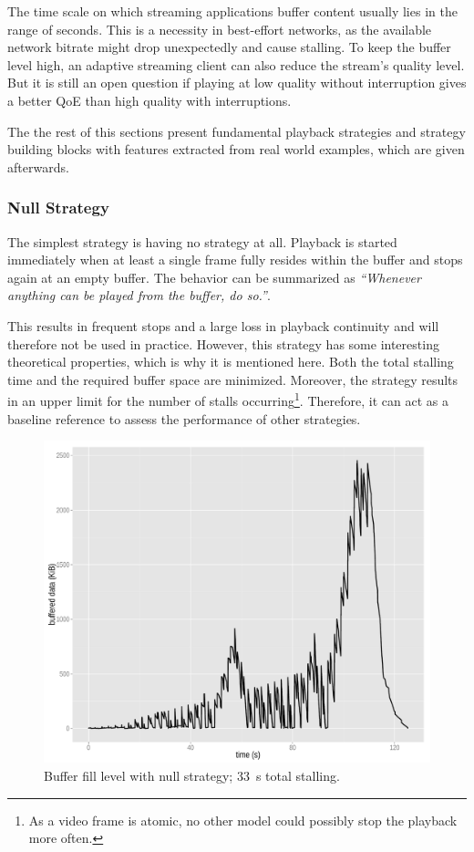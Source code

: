 The time scale on which streaming applications buffer content usually lies in the range of seconds. This is a necessity in best-effort networks, as the available network bitrate might drop unexpectedly and cause stalling. To keep the buffer level high, an adaptive streaming client can also reduce the stream's quality level. But it is still an open question if playing at low quality without interruption gives a better \gls{QoE} than high quality with interruptions.

The the rest of this sections present fundamental playback strategies and strategy building blocks with features extracted from real world examples, which are given afterwards. 



\subsubsection{Null Strategy}

The simplest strategy is having no strategy at all. Playback is started immediately when at least a single frame fully resides within the buffer and stops again at an empty buffer. The behavior can be summarized as \textit{``Whenever anything can be played from the buffer, do so.''}.

This results in frequent stops and a large loss in playback continuity and will therefore not be used in practice. However, this strategy has some interesting theoretical properties, which is why it is mentioned here. Both the total stalling time and the required buffer space are minimized. Moreover, the strategy results in an upper limit for the number of stalls occurring\footnote{As a video frame is atomic, no other model could possibly stop the playback more often.}. Therefore, it can act as a baseline reference to assess the performance of other strategies.

\begin{figure}[htb]
	\centering
	\includegraphics[width=1.0\textwidth]{images/R-bufferlevel-stall.pdf}
	\caption{Buffer fill level with null strategy; \SI{33}{\second} total stalling.}
\label{c3:fig:bufferlevel-stall}
\end{figure}

